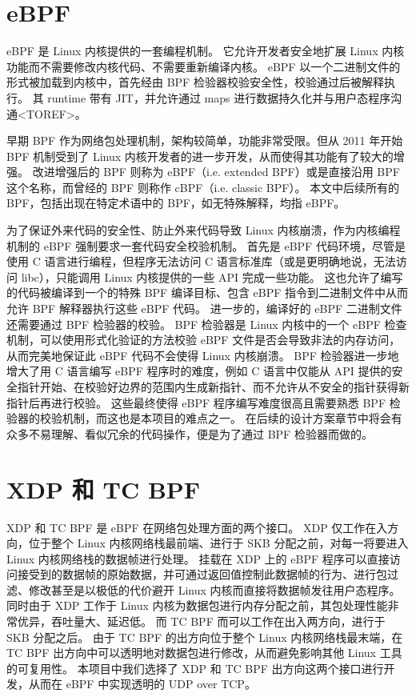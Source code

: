 \section{eBPF}

eBPF 是 Linux 内核提供的一套编程机制。
它允许开发者安全地扩展 Linux 内核功能而不需要修改内核代码、不需要重新编译内核。
eBPF 以一个二进制文件的形式被加载到内核中，首先经由 BPF 检验器校验安全性，校验通过后被解释执行。
其 runtime 带有 JIT，并允许通过 maps 进行数据持久化并与用户态程序沟通<TOREF>。

早期 BPF 作为网络包处理机制，架构较简单，功能非常受限。但从 2011 年开始 BPF 机制受到了 Linux 内核开发者的进一步开发，从而使得其功能有了较大的增强。
改进增强后的 BPF 则称为 eBPF（i.e. extended BPF）或是直接沿用 BPF 这个名称，而曾经的 BPF 则称作 cBPF（i.e. classic BPF）。\cite{10.1145/3371038}
本文中后续所有的 BPF，包括出现在特定术语中的 BPF，如无特殊解释，均指 eBPF。

为了保证外来代码的安全性、防止外来代码导致 Linux 内核崩溃，作为内核编程机制的 eBPF 强制要求一套代码安全校验机制。
首先是 eBPF 代码环境，尽管是使用 C 语言进行编程，但程序无法访问 C 语言标准库（或是更明确地说，无法访问 libc），只能调用 Linux 内核提供的一些 API 完成一些功能。
这也允许了编写的代码被编译到一个的特殊 BPF 编译目标、包含 eBPF 指令到二进制文件中从而允许 BPF 解释器执行这些 eBPF 代码。
进一步的，编译好的 eBPF 二进制文件还需要通过 BPF 检验器的校验。
BPF 检验器是 Linux 内核中的一个 eBPF 检查机制，可以使用形式化验证的方法校验 eBPF 文件是否会导致非法的内存访问，从而完美地保证此 eBPF 代码不会使得 Linux 内核崩溃。
BPF 检验器进一步地增大了用 C 语言编写 eBPF 程序时的难度，例如 C 语言中仅能从 API 提供的安全指针开始、在校验好边界的范围内生成新指针、而不允许从不安全的指针获得新指针后再进行校验。
这些最终使得 eBPF 程序编写难度很高且需要熟悉 BPF 检验器的校验机制，而这也是本项目的难点之一。
在后续的设计方案章节中将会有众多不易理解、看似冗余的代码操作，便是为了通过 BPF 检验器而做的。

\section{XDP 和 TC BPF}

XDP 和 TC BPF 是 eBPF 在网络包处理方面的两个接口。
XDP 仅工作在入方向，位于整个 Linux 内核网络栈最前端、进行于 SKB 分配之前，对每一将要进入 Linux 内核网络栈的数据帧进行处理。
挂载在 XDP 上的 eBPF 程序可以直接访问接受到的数据帧的原始数据，并可通过返回值控制此数据帧的行为、进行包过滤、修改甚至是以极低的代价避开 Linux 内核而直接将数据帧发往用户态程序。
同时由于 XDP 工作于 Linux 内核为数据包进行内存分配之前，其包处理性能非常优异，吞吐量大、延迟低。
而 TC BPF 而可以工作在出入两方向，进行于 SKB 分配之后。
由于 TC BPF 的出方向位于整个 Linux 内核网络栈最末端，在 TC BPF 出方向中可以透明地对数据包进行修改，从而避免影响其他 Linux 工具的可复用性。
本项目中我们选择了 XDP 和 TC BPF 出方向这两个接口进行开发，从而在 eBPF 中实现透明的 UDP over TCP。
